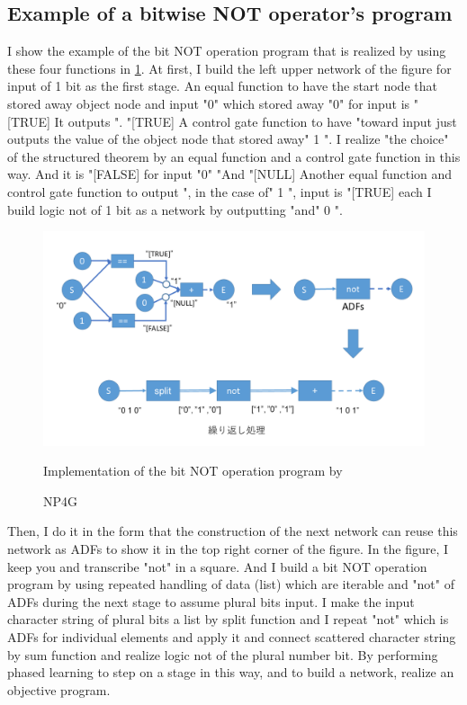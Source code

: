 \documentclass{article}
\begin{document}
\subsection {Example of a bitwise NOT operator's program}
I show the example of the bit NOT operation program that is realized by using these four functions in \ref{fig:bitwise_not}.
At first, I build the left upper network of the figure for input of 1 bit as the first stage.
An equal function to have the start node that stored away object node and input "0" which stored away "0" for input is "[TRUE]
It outputs ".
"[TRUE]
A control gate function to have "toward input just outputs the value of the object node that stored away" 1 ".
I realize "the choice" of the structured theorem by an equal function and a control gate function in this way.
And it is "[FALSE] for input "0"
"And "[NULL]
Another equal function and control gate function to output ", in the case of" 1 ", input is "[TRUE] each
I build logic not of 1 bit as a network by outputting "and" 0 ".
\begin{figure}[t]
\begin{center}
\includegraphics[width=150mm]{bitwise_not.png}
\end{center}
Implementation of the bit NOT operation program by \caption{NP4G}
\label{fig:bitwise_not}
\end{figure}
Then, I do it in the form that the construction of the next network can reuse this network as ADFs to show it in the top right corner of the figure.
In the figure, I keep you and transcribe "not" in a square.
And I build a bit NOT operation program by using repeated handling of data (list) which are iterable and "not" of ADFs during the next stage to assume plural bits input.
I make the input character string of plural bits a list by split function and I repeat "not" which is ADFs for individual elements and apply it and connect scattered character string by sum function and realize logic not of the plural number bit.
By performing phased learning to step on a stage in this way, and to build a network, realize an objective program.
\end{document}
